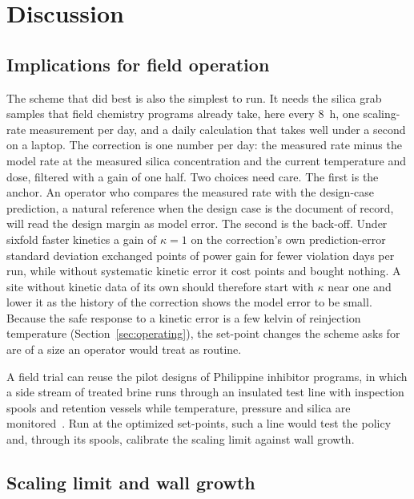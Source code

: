 \section{Discussion}\label{sec:discussion}

\subsection{Implications for field operation}\label{sec:field}

The scheme that did best is also the simplest to run. It needs the
silica grab samples that field chemistry programs already take, here
every 8~h, one scaling-rate measurement per day, and a daily calculation
that takes well under a second on a laptop. The correction is one
number per day: the measured rate minus the model rate at the measured
silica concentration and the current temperature and dose, filtered
with a gain of one half. Two choices need care. The first is the
anchor. An operator who compares the measured rate with the design-case
prediction, a natural reference when the design case is the document of
record, will read the design margin as model error. The second is the
back-off. Under sixfold faster kinetics a gain of $\kappa = 1$ on the
correction's own prediction-error standard deviation exchanged
 points of power gain for  fewer
violation days per run, while without systematic kinetic error it cost
 points and bought nothing. A site without kinetic data of
its own should therefore start with $\kappa$ near one and lower it as
the history of the correction shows the model error to be small.
Because the safe response to a kinetic error is a few kelvin of
reinjection temperature (Section~\ref{sec:operating}), the set-point
changes the scheme asks for are of a size an operator would treat as
routine.

A field trial can reuse the pilot designs of Philippine inhibitor
programs, in which a side stream of treated brine runs through an
insulated test line with inspection spools and retention vessels while
temperature, pressure and silica are monitored~\citep{see2010wgc}. Run
at the optimized set-points, such a line would test the policy and,
through its spools, calibrate the scaling limit against wall growth.

\subsection{Scaling limit and wall growth}\label{sec:units}

